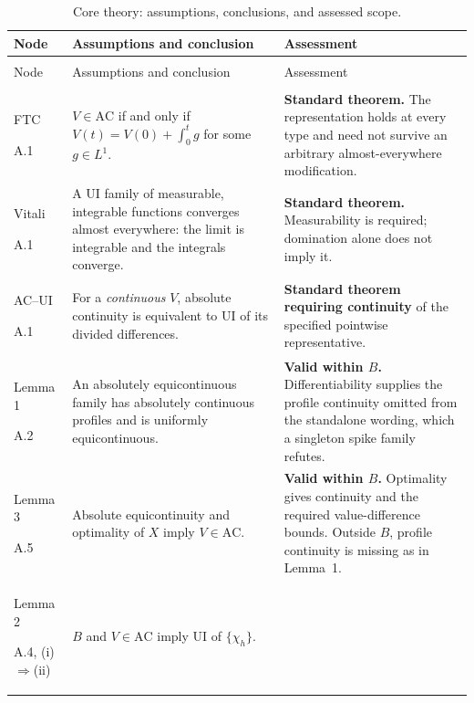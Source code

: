 \documentclass[11pt]{article}
\theoremstyle{remark}\newtheorem{remark}[theorem]{Remark}
\begin{document}
\begingroup
\small
\setlength{\tabcolsep}{3pt}
\renewcommand{\arraystretch}{1.14}
\begin{longtable}{@{}>{\raggedright\arraybackslash}p{2.60cm}>{\raggedright\arraybackslash}p{6.30cm}>{\raggedright\arraybackslash}p{6.45cm}@{}}
\caption{Core theory: assumptions, conclusions, and assessed scope.}
\label{tab:dependency-core-full}\\
\toprule
Node & Assumptions and conclusion & Assessment \\
\midrule
\endfirsthead
\multicolumn{3}{@{}l}{\textit{Table \thetable\ continued}}\\
\toprule
Node & Assumptions and conclusion & Assessment \\
\midrule
\endhead
\midrule
\multicolumn{3}{r@{}}{\textit{Continued on next page}}\\
\endfoot
\bottomrule
\endlastfoot
FTC\par A.1
& $V\in\mathrm{AC}$ if and only if $V(t)=V(0)+\int_0^t g$ for some $g\in L^1$.
& \textbf{Standard theorem.} The representation holds at every type and need not survive an arbitrary almost-everywhere modification. \\
Vitali\par A.1
& A UI family of measurable, integrable functions converges almost everywhere: the limit is integrable and the integrals converge.
& \textbf{Standard theorem.} Measurability is required; domination alone does not imply it. \\
AC--UI\par A.1
& For a \emph{continuous} $V$, absolute continuity is equivalent to UI of its divided differences.
& \textbf{Standard theorem requiring continuity} of the specified pointwise representative. \\
Lemma 1\par A.2
& An absolutely equicontinuous family has absolutely continuous profiles and is uniformly equicontinuous.
& \textbf{Valid within $B$.} Differentiability supplies the profile continuity omitted from the standalone wording, which a singleton spike family refutes. \\
Lemma 3\par A.5
& Absolute equicontinuity and optimality of $X$ imply $V\in\mathrm{AC}$.
& \textbf{Valid within $B$.} Optimality gives continuity and the required value-difference bounds. Outside $B$, profile continuity is missing as in Lemma~1. \\
Lemma 2\par A.4, (i)$\Rightarrow$(ii)
& $B$ and $V\in\mathrm{AC}$ imply UI of $\{\chi_h\}$.

\end{longtable}
\end{document}
